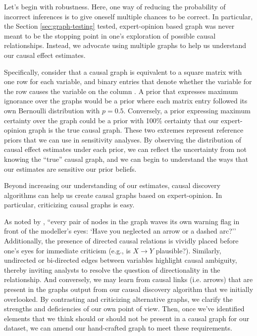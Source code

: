 Let's begin with robustness.
Here, one way of reducing the probability of incorrect inferences is to give oneself multiple chances to be correct.
In particular, the Section \ref{sec:graph-testing} tested, expert-opinion based graph was never meant to be the stopping point in one's exploration of possible causal relationships.
Instead, we advocate using multiple graphs to help us understand our causal effect estimates.

Specifically, consider that a causal graph is equivalent to a square matrix with one row for each variable, and binary entries that denote whether the variable for the row causes the variable on the column \citep[p. 3]{glymour_2019_review}.
A prior that expresses maximum ignorance over the graphs would be a prior where each matrix entry followed its own Bernoulli distribution with $p=0.5$.
Conversely, a prior expressing maximum certainty over the graph could be a prior with 100\% certainty that our expert-opinion graph is the true causal graph.
These two extremes represent reference priors that we can use in sensitivity analyses.
By observing the distribution of causal effect estimates under each prior, we can reflect the uncertainty from not knowing the ``true'' causal graph, and we can begin to understand the ways that our estimates are sensitive our prior beliefs.

Beyond increasing our understanding of our estimates, causal discovery algorithms can help us create causal graphs based on expert-opinion.
In particular, criticizing causal graphs is easy.

As noted by \citet[p. 708]{pearl_1995_causal}, ``every pair of nodes in the graph waves its own warning flag in front of the modeller's eyes: `Have you neglected an arrow or a dashed arc?''
Additionally, the presence of directed causal relations is vividly placed before one's eyes for immediate criticism (e.g., is $X \rightarrow Y$ plausible?).
Similarly, undirected or bi-directed edges between variables highlight causal ambiguity, thereby inviting analysts to resolve the question of directionality in the relationship.
And conversely, we may learn from causal links (i.e. arrows) that are present in the graphs output from our causal discovery algorithm that we initially overlooked.
By contrasting and criticizing alternative graphs, we clarify the strengths and deficiencies of our own point of view.
Then, once we've identified elements that we think should or should not be present in a causal graph for our dataset, we can amend our hand-crafted graph to meet these requirements.

